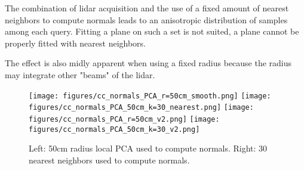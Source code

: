 \documentclass[a4paper]{article}
\begin{document}
The combination of lidar acquisition and the use of a fixed amount of nearest neighbors 
to compute normals leads to an anisotropic distribution of samples among each query.
Fitting a plane on such a set is not suited, a plane cannot be properly fitted with nearest neighbors.

The effect is also midly apparent when using a fixed radius because the radius may integrate other "beams" of the lidar.


\begin{figure}[ht]
  \centering
  \texttt{[image: figures/cc\_normals\_PCA\_r=50cm\_smooth.png]}
  \texttt{[image: figures/cc\_normals\_PCA\_50cm\_k=30\_nearest.png]}
  \texttt{[image: figures/cc\_normals\_PCA\_r=50cm\_v2.png]}
  \texttt{[image: figures/cc\_normals\_PCA\_50cm\_k=30\_v2.png]}
  \caption{Left: 50cm radius local PCA used to compute normals. 
  Right: 30 nearest neighbors used to compute normals.} 
  \label{fig:local_PCA_neighbor}
\end{figure}
\end{document}
